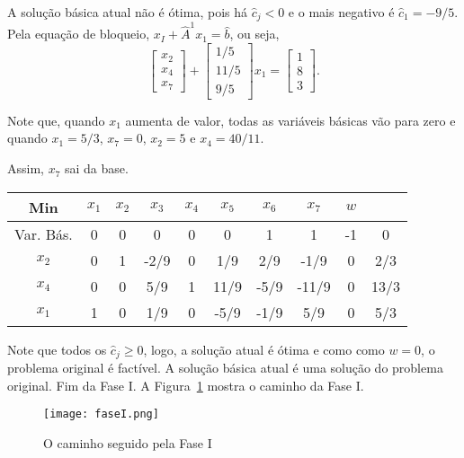 A solução básica atual não é ótima, pois há $ \widehat{c}_j < 0 $ e o mais 
negativo é $ \widehat{c}_1 = -9/5 $.
Pela equação de bloqueio, $ x_I + \widehat{A}^{1}x_1 = \widehat{b} $, ou seja,
\[
  \begin{bmatrix}
    x_2 \\ x_4 \\ x_7
  \end{bmatrix} 
  +
  \begin{bmatrix}
    1/5 \\ 11/5 \\ 9/5 
  \end{bmatrix}
  x_1
  =
  \begin{bmatrix}
    1 \\ 8 \\ 3
  \end{bmatrix}.
\]

Note que, quando $ x_1 $ aumenta de valor, todas as variáveis básicas vão para
zero e quando $ x_1 = 5/3 $, $ x_7 = 0 $, $ x_2 = 5 $ e $ x_4 = 40/11 $.

Assim, $ x_7 $ sai da base.

\begin{table}[!htbp]
  \centering
  \begin{tabular}{c|cccccccc|c}
    Min       & $x_1$ & $x_2$ & $x_3$ & $x_4$ & $x_5$ & $x_6$ & $x_7$ & $w$ &      \\ \hline 
    Var. Bás. & 0     & 0     & 0     & 0     & 0     & 1     & 1     & -1  & 0    \\ \hline
    $x_2$     & 0     & 1     & -2/9  & 0     & 1/9   & 2/9   & -1/9  & 0   & 2/3  \\
    $x_4$     & 0     & 0     & 5/9   & 1     & 11/9  & -5/9  & -11/9 & 0   & 13/3 \\
    $x_1$     & 1     & 0     & 1/9   & 0     & -5/9  & -1/9  & 5/9   & 0   & 5/3
  \end{tabular}
\end{table}

Note que todos os $ \widehat{c}_j \geq 0 $, logo, a solução atual é ótima e como
como $ w = 0 $, o problema original é factível.
A solução básica atual é uma solução do problema original.
Fim da Fase I.
A Figura~\ref{fig:faseI} mostra o caminho da Fase I.

\begin{figure}[!htbp]
  \centering
  \texttt{[image: faseI.png]}
  \caption{O caminho seguido pela Fase I}
  \label{fig:faseI}
\end{figure}


